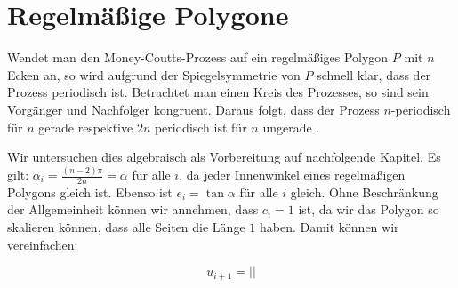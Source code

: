 \chapter{Regelmäßige Polygone}

Wendet man den Money-Coutts-Prozess auf ein regelmäßiges Polygon $P$ mit $n$ Ecken an, so wird aufgrund der Spiegelsymmetrie von $P$ schnell klar,
dass der Prozess periodisch ist.
Betrachtet man einen Kreis des Prozesses, so sind sein Vorgänger und Nachfolger kongruent.
Daraus folgt, dass der Prozess $n$-periodisch für $n$ gerade respektive $2n$ periodisch ist für $n$ ungerade \citep{Taba2000}.

Wir untersuchen dies algebraisch als Vorbereitung auf nachfolgende Kapitel.
Es gilt: $\alpha_i = \frac{(n-2) \pi}{2n} = \alpha$ für alle $i$, da jeder Innenwinkel eines regelmäßigen Polygons gleich ist.
Ebenso ist $e_i=\tan \alpha$ für alle $i$ gleich.
Ohne Beschränkung der Allgemeinheit können wir annehmen, dass $c_i=1$ ist,
da wir das Polygon so skalieren können, dass alle Seiten die Länge $1$ haben.
Damit können wir  vereinfachen:

\begin{equation}
    u_{i+1}=||
\end{equation}